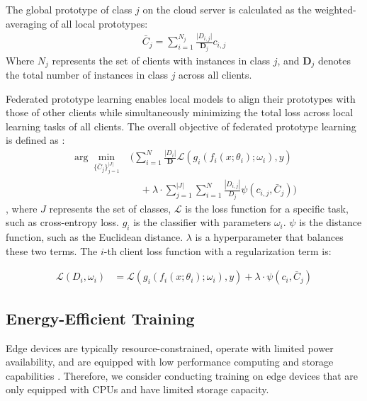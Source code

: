 \documentclass[journal]{IEEEtran}
\begin{document}
The global prototype of class $j$ on the cloud server is calculated as the weighted-averaging of all local prototypes:
\begin{align}
\label{cloud prototype formula}
\bar{C}_j = \sum_{i=1}^{N_j}{ \frac{\rvert D_{i,j}\rvert}{\mathbf{D}_j} c_{i,j}}
\end{align} 
Where $N_j$ represents the set of clients with instances in class \(j\), and $\mathbf{D}_j$ denotes the total number of instances in class \(j\) across all clients.

Federated prototype learning enables local models to align their prototypes with those of other clients while simultaneously minimizing the total loss across local learning tasks of all clients. The overall objective of federated prototype learning is defined as \cite{tan_fedproto_2021}:
\begin{align}
\label{overall objective formula}
\arg\min_{\{\bar{C}_j\}^{|J|}_{j=1}}  &\bigg(\sum_{i=1}^N \frac{|D_i|}{\mathbf{D}} \mathcal{L}(g_i(f_i(x;\theta_i); \omega_i), y) \\
&\quad + \lambda \cdot \sum_{j=1}^{|J|} \sum_{i=1}^N \frac{|D_{i,j}|}{D_j} \psi(c_{i,j}, \bar{C}_j) \bigg)
\end{align},
where $J$ represents the set of classes, $\mathcal{L}$ is the loss function for a specific task, such as cross-entropy loss. $g_i$ is the classifier with parameters $\omega_i$. $\psi$ is the distance function, such as the Euclidean distance.  $\lambda$ is a hyperparameter that balances these two terms. The $i$-th client loss function with a regularization term \cite{tan_fedproto_2021} is:

\begin{align}
  \label{original loss function}
  \mathcal{L}(D_i,\omega_i) &=  \mathcal{L}(g_i(f_i(x;\theta_i); \omega_i), y) + \lambda \cdot \psi(c_{i}, \bar{C}_j)
\end{align}

\subsection{Energy-Efficient Training}
\label{Energy-Efficient Training}
Edge devices are typically resource-constrained, operate with limited power availability, and are equipped with low performance computing and storage capabilities \cite{jiang2020energy}.  Therefore, we consider conducting training on edge devices that are only equipped with CPUs and have limited storage capacity.
\end{document}
